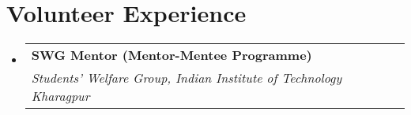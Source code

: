 \documentclass[a4paper,20pt]{article}
\makeatletter
\newcommand{\resumeSubheading}[4]{
  \vspace{-1pt}\item
    \begin{tabular*}{0.97\textwidth}{l@{\extracolsep{\fill}}r}
      \textbf{#1} & #2 \\
      \textit{#3} & \textit{#4} \\
    \end{tabular*}\vspace{-5pt}
}
\newcommand{\resumeSubHeadingListStart}{\begin{itemize}[leftmargin=*]}
\newcommand{\resumeSubHeadingListEnd}{\end{itemize}}
\makeatother
\begin{document}
\vspace{0pt}
\section{Volunteer Experience}
  \resumeSubHeadingListStart
    \resumeSubheading
    {SWG Mentor (Mentor-Mentee Programme)}{}
    {Students' Welfare Group, Indian Institute of Technology Kharagpur}{}
  \resumeSubHeadingListEnd
\vspace{5pt}
\end{document}
